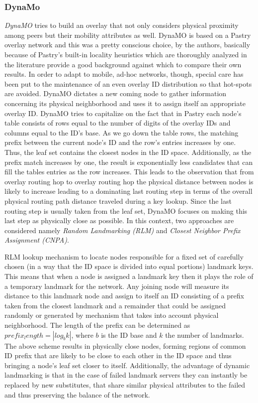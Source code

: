 \subsubsection{DynaMo}
\emph{DynaMO} \cite{WZS2004} tries to build an overlay that not only 
considers physical proximity among peers but their mobility attributes as well.
DynaMO is based on a Pastry overlay network and this was a pretty conscious
choice, by the authors, basically because of Pastry's built-in locality
heuristics which are thoroughly analyzed in the literature \cite{CDCR2002a}
provide a good background against which to compare their own results. In
order to adapt to mobile, ad-hoc networks, though, special care has been put to
the maintenance of an even overlay ID distribution so that hot-spots are
avoided. DynaMO dictates a new coming node to gather information concerning its
physical neighborhood and uses it to assign itself an appropriate overlay ID.
DynaMO tries to capitalize on the fact that in Pastry each node's table consists
of rows equal to the number of digits of the overlay IDs and columns equal to
the ID's base. As we go down the table rows, the matching prefix between the
current node's ID and the row's entries increases by one. Thus, the leaf set
contains the closest nodes in the ID space. Additionally, as the prefix match
increases by one, the result is exponentially less candidates that can fill the
tables entries as the row increases. This leads to the observation
\cite{antony_pastry_2001,CDCR2002a} that from overlay routing hop to overlay
routing hop the physical distance between nodes is likely to increase leading to
a dominating last routing step in terms of the overall physical routing path
distance traveled during a key lookup. Since the last routing step is usually
taken from the leaf set, DynaMO focuses on making this last step as physically
close as possible. In this context, two approaches are considered namely
\emph{Random Landmarking (RLM)} and \emph{Closest Neighbor Prefix Assignment
(CNPA)}.

RLM lookup mechanism to locate nodes responsible for a fixed set of carefully
chosen (in a way that the ID space is divided into equal portions) landmark
keys. This means that when a node is assigned a landmark key then it plays the
role of a temporary landmark for the network. Any joining node will measure its
distance to this landmark node and assign to itself an ID consisting
of a prefix taken from the closest landmark and a remainder that could be
assigned randomly or generated by mechanism that takes into account physical
neighborhood. The length of the prefix can be determined as
$prefix_length=|log_b k|$, where $b$ is the ID base and $k$ the number of
landmarks. The above scheme results in physically close nodes, forming regions
of common ID prefix that are likely to be close to each other in the ID space
and thus bringing a node's leaf set closer to itself. Additionally, the
advantage of dynamic landmarking is that in the case of failed landmark servers
they can instantly be replaced by new substitutes, that share similar physical
attributes to the failed and thus preserving the balance of the network.


